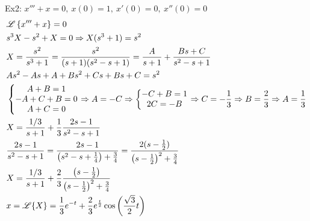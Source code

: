 \documentclass[11pt, fleqn]{article}
\begin{document}
Ex2: $x'''+x=0,\ x(0)=1,\ x'(0)=0,\ x''(0)=0$
\begin{align*}
    &\mathscr{L}\left\{ x'''+x \right\}=0\\
    &s^3X-s^2+X=0\Rightarrow X(s^3+1)=s^2\\
    &X=\frac{s^2}{s^3+1}=\frac{s^2}{(s+1)(s^2-s+1)}=\frac{A}{s+1}+\frac{Bs+C}{s^2-s+1}\\
    &As^2-As+A+Bs^2+Cs+Bs+C=s^2\\
    &\left\{\begin{matrix} A+B=1\\-A+C+B=0\\A+C=0 \end{matrix}\right.\Rightarrow A=-C\Rightarrow \left\{\begin{matrix} -C+B=1\\2C=-B \end{matrix}\right.\Rightarrow C=-\frac{1}{3}\Rightarrow B=\frac{2}{3}\Rightarrow A=\frac{1}{3}\\
    &X=\frac{1/3}{s+1}+\frac{1}{3}\frac{2s-1}{s^2-s+1}\\
    &\frac{2s-1}{s^2-s+1}=\frac{2s-1}{\left( s^2-s+\frac{1}{4} \right)+\frac{3}{4}}=\frac{2(s-\frac{1}{2})}{\left( s-\frac{1}{2} \right)^2+\frac{3}{4}}\\
    &X=\frac{1/3}{s+1}+\frac{2}{3}\frac{\left( s-\frac{1}{2} \right)}{\left( s-\frac{1}{2} \right)^2+\frac{3}{4}}\\
    &x=\mathscr{L}\{X\}=\frac{1}{3}e^{-t}+\frac{2}{3}e^{\frac{t}{2}}\cos\left( \frac{\sqrt{3}}{2}t \right)
\end{align*}
\end{document}
